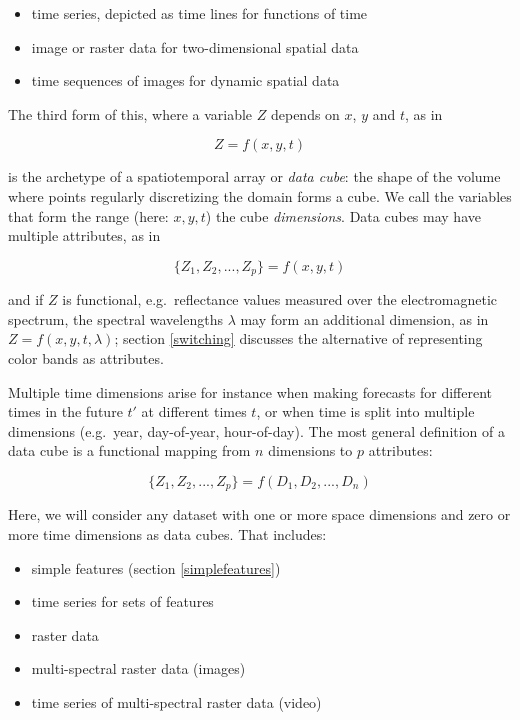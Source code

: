 \documentclass[]{book}
\providecommand{\tightlist}{%
  \setlength{\itemsep}{0pt}\setlength{\parskip}{0pt}}
\begin{document}
\begin{itemize}
\tightlist
\item
  time series, depicted as time lines for functions of time
\item
  image or raster data for two-dimensional spatial data
\item
  time sequences of images for dynamic spatial data
\end{itemize}

The third form of this, where a variable \(Z\) depends on \(x\), \(y\)
and \(t\), as in

\[Z = f(x, y, t)\]

is the archetype of a spatiotemporal array or \emph{data cube}: the shape
of the volume where points regularly discretizing the domain forms a
cube. We call the variables that form the range (here: \(x, y, t\)) the
cube \emph{dimensions}. Data cubes may have multiple attributes, as in

\[\{Z_1,Z_2,...,Z_p\} = f(x, y, t)\]

and if \(Z\) is functional, e.g.~reflectance values measured over
the electromagnetic spectrum, the spectral wavelengths \(\lambda\)
may form an additional dimension, as in \(Z = f(x,y,t,\lambda)\);
section \ref{switching} discusses the alternative of representing
color bands as attributes.

Multiple time dimensions arise for instance when making forecasts for
different times in the future \(t'\) at different times \(t\), or when
time is split into multiple dimensions (e.g.~year, day-of-year,
hour-of-day). The most general definition of a data cube is a
functional mapping from \(n\) dimensions to \(p\) attributes:

\[\{Z_1,Z_2,...,Z_p\} = f(D_1,D_2,...,D_n)\]

Here, we will consider any dataset with one or more space dimensions
and zero or more time dimensions as data cubes. That includes:

\begin{itemize}
\tightlist
\item
  simple features (section \ref{simplefeatures})
\item
  time series for sets of features
\item
  raster data
\item
  multi-spectral raster data (images)
\item
  time series of multi-spectral raster data (video)
\end{itemize}
\end{document}
